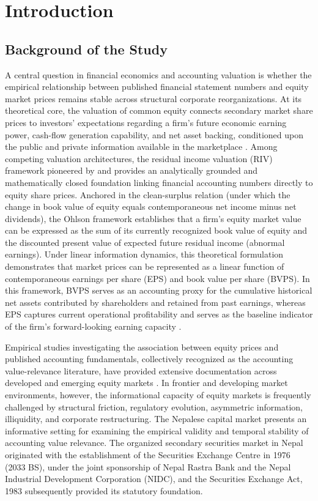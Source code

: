 \chapter{Introduction}
\label{ch:introduction}

\section{Background of the Study}
\label{sec:background}

A central question in financial economics and accounting valuation is whether the empirical relationship between published financial statement numbers and equity market prices remains stable across structural corporate reorganizations. At its theoretical core, the valuation of common equity connects secondary market share prices to investors' expectations regarding a firm's future economic earning power, cash-flow generation capability, and net asset backing, conditioned upon the public and private information available in the marketplace \citep{beaver1968,fama1970}. Among competing valuation architectures, the residual income valuation (RIV) framework pioneered by \citet{ohlson1995} and \citet{feltham1995} provides an analytically grounded and mathematically closed foundation linking financial accounting numbers directly to equity share prices. Anchored in the clean-surplus relation (under which the change in book value of equity equals contemporaneous net income minus net dividends), the Ohlson framework establishes that a firm's equity market value can be expressed as the sum of its currently recognized book value of equity and the discounted present value of expected future residual income (abnormal earnings). Under linear information dynamics, this theoretical formulation demonstrates that market prices can be represented as a linear function of contemporaneous earnings per share (EPS) and book value per share (BVPS). In this framework, BVPS serves as an accounting proxy for the cumulative historical net assets contributed by shareholders and retained from past earnings, whereas EPS captures current operational profitability and serves as the baseline indicator of the firm's forward-looking earning capacity \citep{collins1997}.

Empirical studies investigating the association between equity prices and published accounting fundamentals, collectively recognized as the accounting value-relevance literature, have provided extensive documentation across developed and emerging equity markets \citep{collins1997,almumani2014,malhotra2013,sharma2011}. In frontier and developing market environments, however, the informational capacity of equity markets is frequently challenged by structural friction, regulatory evolution, asymmetric information, illiquidity, and corporate restructuring. The Nepalese capital market presents an informative setting for examining the empirical validity and temporal stability of accounting value relevance. The organized secondary securities market in Nepal originated with the establishment of the Securities Exchange Centre in 1976 (2033 BS), under the joint sponsorship of Nepal Rastra Bank and the Nepal Industrial Development Corporation (NIDC), and the Securities Exchange Act, 1983 subsequently provided its statutory foundation.

